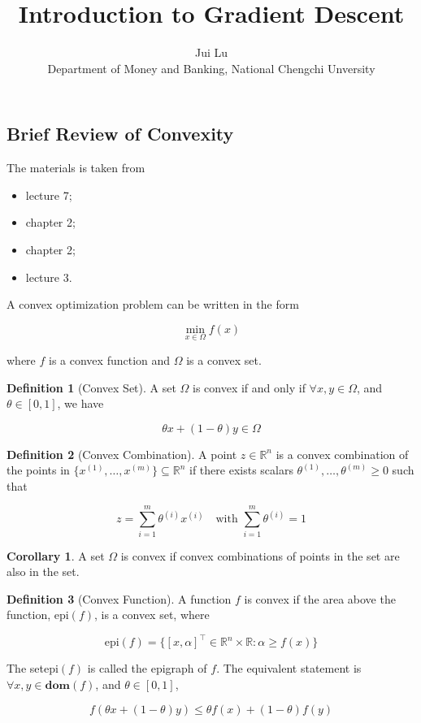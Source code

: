 \documentclass[12pt]{article} %
\title{Introduction to Gradient Descent}
\author{Jui Lu \\ Department of Money and Banking, National Chengchi Unversity}
\theoremstyle{definition}
\newtheorem{definition}{Definition}
\newtheorem{corollary}{Corollary}
\newcommand{\Real}{\mathbb{R}}
\begin{document}
\maketitle

\subsection*{Brief Review of Convexity}

\noindent The materials is taken from

\begin{itemize}
	\item \cite{ahmadi15convex} lecture 7;
	\item \cite{audet2017derivative} chapter 2;
	\item \cite{boyd2004convex} chapter 2;
	\item \cite{schmidt18machine} lecture 3.
\end{itemize}

A convex optimization problem can be written in the form

$$
	\min_{x \in \Omega} f(x)
$$

\noindent where $f$ is a convex function and $\Omega$ is a convex set.

\begin{definition}[Convex Set]
	A set $\Omega$ is convex if and only if $\forall x, y \in \Omega$, and $\theta \in [0, 1]$, we have

	$$
		\theta x + (1 - \theta) y \in \Omega
	$$
\end{definition}

\begin{definition}[Convex Combination]
	A point $z \in \Real^n$ is a convex combination of the points in $\{x^{(1)}, \dots, x^{(m)}\} \subseteq \Real^n$ if there exists scalars $\theta^{(1)}, \dots, \theta^{(m)} \ge 0$ such that

	$$
		z = \sum_{i = 1}^m \theta^{(i)} x^{(i)} \quad \text{with } \sum_{i = 1}^m \theta^{(i)} = 1
	$$
\end{definition}

\begin{corollary}
	A set $\Omega$ is convex if convex combinations of points in the set are also in the set.
\end{corollary}

\begin{definition}[Convex Function]
	A function $f$ is convex if the area above the function, $\text{epi}(f)$, is a convex set, where

	$$
		\text{epi}(f) = \{[x, \alpha]^\intercal \in \Real^n \times \Real: \alpha \ge f(x) \}
	$$

	\noindent The set$\text{epi}(f)$ is called the epigraph of $f$. The equivalent statement is $\forall x, y \in \mathbf{dom}(f)$, and $\theta \in [0, 1]$,

	$$
		f(\theta x + (1 - \theta) y) \le \theta f(x) + (1 - \theta) f(y)
	$$
\end{definition}
\end{document}
